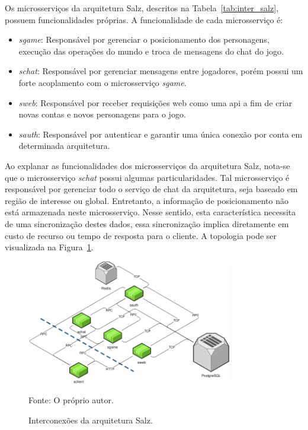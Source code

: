 Os microsserviços da arquitetura Salz, descritos na Tabela~\ref{tab:inter_salz}, possuem funcionalidades próprias.
%
A funcionalidade de cada microsserviço é:



\begin{itemize}
  \item \textit{sgame}: Responsável por gerenciar o posicionamento dos personagens, execução das operações do mundo e troca de mensagens do chat do jogo.
  \item \textit{schat}: Responsável por gerenciar mensagens entre jogadores, porém possui um forte acoplamento com o microsserviço \textit{sgame}.
  \item \textit{sweb}: Responsável por receber requisições web como uma \ac{api} a fim de criar novas contas e novos personagens para o jogo.
  \item \textit{sauth}: Responsável por autenticar e garantir uma única conexão por conta em determinada arquitetura.
\end{itemize}



Ao explanar as funcionalidades dos microsserviços da arquitetura Salz, nota-se que o microsserviço \textit{schat} possui algumas particularidades.
%
Tal microsserviço é responsável por gerenciar todo o serviço de chat da arquitetura, seja baseado em região de interesse ou global.
%
Entretanto, a informação de posicionamento não está armazenada neste microsserviço.
%
Nesse sentido, esta característica necessita de uma sincronização destes dados, essa sincronização implica diretamente em custo de recurso ou tempo de resposta para o cliente.
%
A topologia pode ser visualizada na Figura~\ref{fig:interconexao_salz}.



\begin{figure}[htb!]
  \caption{Interconexões da arquitetura Salz.}
  \label{fig:interconexao_salz}
  \includegraphics[width=0.8\textwidth]{figuras/interconexoes/salz.png}
  \centering

  Fonte: O próprio autor.
\end{figure}



